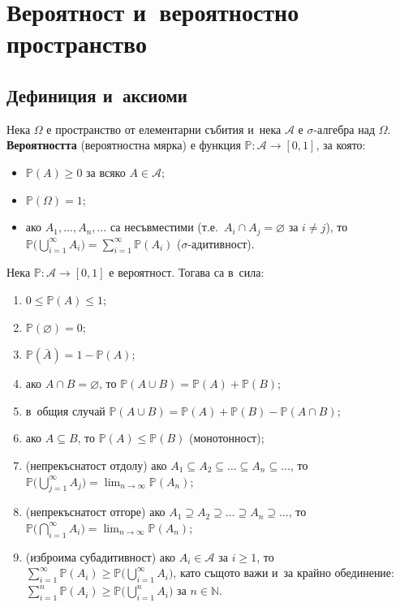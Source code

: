 \chapter{Вероятност и~вероятностно пространство}

\section{Дефиниция и~аксиоми}

\begin{defbox}[~(Вероятност)]
Нека $\Omega$ е пространство от елементарни събития и~нека
$\mathcal{A}$ е $\sigma$-алгебра над $\Omega$. \textbf{Вероятността}
(вероятностна мярка) е функция $\mathbb{P}:\mathcal{A}\to[0,1]$, за
която:
\begin{itemize}[nosep]
  \item $\mathbb{P}(A) \geq 0$ за всяко $A\in\mathcal A$;
  \item $\mathbb{P}(\Omega) = 1$;
  \item ако $A_1,\dots,A_n,\dots$ са несъвместими (т.е.\ $A_i\cap A_j=\varnothing$ за $i\neq j$), то
  $\displaystyle \mathbb{P}\Big(\bigcup_{i=1}^{\infty}A_i\Big) = \sum_{i=1}^{\infty}\mathbb{P}(A_i)$ ($\sigma$-адитивност).
\end{itemize}
\end{defbox}

\begin{corbox}
Нека $\mathbb{P}:\mathcal{A}\to[0,1]$ е вероятност. Тогава са в~сила:
\begin{enumerate}[label=\alph*)]
  \item $0 \leq \mathbb{P}(A) \leq 1$;
  \item $\mathbb{P}(\varnothing) = 0$;
  \item $\mathbb{P}(\bar A) = 1-\mathbb{P}(A)$;
  \item ако $A\cap B=\varnothing$, то $\mathbb{P}(A\cup B)=\mathbb{P}(A)+\mathbb{P}(B)$;
  \item в~общия случай $\mathbb{P}(A\cup B) = \mathbb{P}(A)+\mathbb{P}(B)-\mathbb{P}(A\cap B)$;
  \item ако $A\subseteq B$, то $\mathbb{P}(A)\leq\mathbb{P}(B)$ (монотонност);
  \item (непрекъснатост отдолу) ако $A_1\subseteq A_2\subseteq\dots\subseteq A_n\subseteq\dots$, то
  $\displaystyle \mathbb{P}\Big(\bigcup_{j=1}^{\infty}A_j\Big)=\lim_{n\to\infty}\mathbb{P}(A_n)$;
  \item (непрекъснатост отгоре) ако $A_1\supseteq A_2\supseteq\dots\supseteq A_n\supseteq\dots$, то
  $\displaystyle \mathbb{P}\Big(\bigcap_{i=1}^{\infty}A_i\Big)=\lim_{n\to\infty}\mathbb{P}(A_n)$;
  \item (изброима субадитивност) ако $A_i\in\mathcal A$ за $i\geq 1$, то
  $\displaystyle \sum_{i=1}^{\infty}\mathbb{P}(A_i) \geq \mathbb{P}\Big(\bigcup_{i=1}^{\infty}A_i\Big)$,
  като същото важи и~за крайно обединение: $\sum_{i=1}^{n}\mathbb{P}(A_i)\geq\mathbb{P}\big(\bigcup_{i=1}^{n}A_i\big)$ за $n\in\mathbb N$.
\end{enumerate}
\end{corbox}

